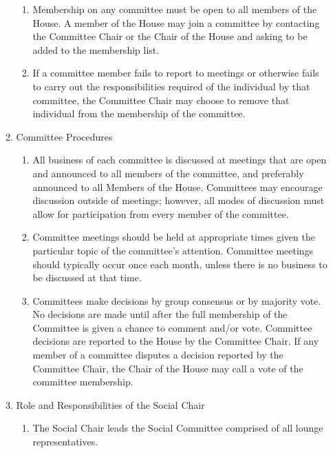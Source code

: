 \documentclass[letterpaper]{article}
\begin{document}
\begin{enumerate}
\begin{enumerate}
\begin{enumerate}
\item Membership on any committee must be open to all members of the House. A member of the House may join a committee by contacting the Committee Chair or the Chair of the House and asking to be added to the membership list.

\item If a committee member fails to report to meetings or otherwise fails to carry out the responsibilities required of the individual by that committee, the Committee Chair may choose to remove that individual from the membership of the committee.

\end{enumerate}

\item Committee Procedures 

\begin{enumerate}

\item All business of each committee is discussed at meetings that are open and announced to all members of the committee, and preferably announced to all Members of the House. Committees may encourage discussion outside of meetings; however, all modes of discussion must allow for participation from every member of the committee.

\item Committee meetings should be held at appropriate times given the particular topic of the committee's attention. Committee meetings should typically occur once each month, unless there is no business to be discussed at that time.

\item Committees make decisions by group consensus or by majority vote. No decisions are made until after the full membership of the Committee is given a chance to comment and/or vote. Committee decisions are reported to the House by the Committee Chair. If any member of a committee disputes a decision reported by the Committee Chair, the Chair of the House may call a vote of the committee membership.

\end{enumerate}

\item Role and Responsibilities of the Social Chair

\begin{enumerate}

\item The Social Chair leads the Social Committee comprised of all lounge representatives.
 

\end{enumerate}
\end{enumerate}
\end{enumerate}
\end{document}
